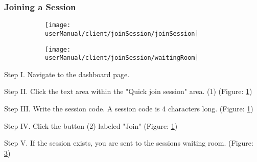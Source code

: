 \subsubsection{Joining a Session}

\begin{figure}[H]
	\begin{subfigure}{0.70\linewidth}
		\texttt{[image: userManual/client/joinSession/joinSession]}
		\caption{}
		\label{fig:joinSession}
	\end{subfigure}
	\begin{subfigure}{0.70\linewidth}
		\texttt{[image: userManual/client/joinSession/waitingRoom]}
		\caption{}
		\label{fig:waitingRoom}
	\end{subfigure}
\end{figure}

\begin{userManualItemlist}
	\item[Step I.] Navigate to the dashboard page.
	\item[Step II.] Click the text area within the "Quick join session" area. (1) (Figure: \ref{fig:joinSession})
	\item[Step III.] Write the session code. A session code is 4 characters long. (Figure: \ref{fig:joinSession})
	\item[Step IV.] Click the button (2) labeled "Join" (Figure: \ref{fig:joinSession}) 
	\item[Step V.] If the session exists, you are sent to the sessions waiting room. (Figure: \ref{fig:waitingRoom})
\end{userManualItemlist}